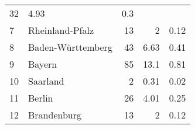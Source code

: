 \begin{longtable}{lXrrr}
       \num{32} &
       \num[round-mode=places,round-precision=2]{4.93} &
         \num[round-mode=places,round-precision=2]{0.3} \\

     7 &
     \multicolumn{1}{X}{ Rheinland-Pfalz   } &


       \num{13} &
       \num[round-mode=places,round-precision=2]{2} &
         \num[round-mode=places,round-precision=2]{0.12} \\

     8 &
     \multicolumn{1}{X}{ Baden-Württemberg   } &


       \num{43} &
       \num[round-mode=places,round-precision=2]{6.63} &
         \num[round-mode=places,round-precision=2]{0.41} \\

     9 &
     \multicolumn{1}{X}{ Bayern   } &


       \num{85} &
       \num[round-mode=places,round-precision=2]{13.1} &
         \num[round-mode=places,round-precision=2]{0.81} \\

     10 &
     \multicolumn{1}{X}{ Saarland   } &


       \num{2} &
       \num[round-mode=places,round-precision=2]{0.31} &
         \num[round-mode=places,round-precision=2]{0.02} \\

     11 &
     \multicolumn{1}{X}{ Berlin   } &


       \num{26} &
       \num[round-mode=places,round-precision=2]{4.01} &
         \num[round-mode=places,round-precision=2]{0.25} \\

     12 &
     \multicolumn{1}{X}{ Brandenburg   } &


       \num{13} &
       \num[round-mode=places,round-precision=2]{2} &
         \num[round-mode=places,round-precision=2]{0.12} \\


\end{longtable}

